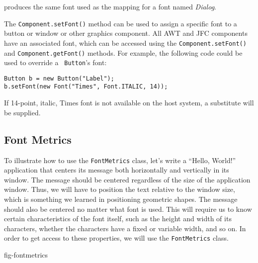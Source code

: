\noindent produces the same font used as the mapping for a
font named {\em Dialog}.


The {\tt Component.setFont()} method can be used to assign a specific
font to a button or window or other graphics component.  All AWT and
JFC components have an associated font, which can be accessed using
the {\tt Component.setFont()} and {\tt Component.getFont()} methods.
For example, the following code could be used to override a {\tt
Button}'s font:

\begin{jjjlisting}
\begin{lstlisting}
Button b = new Button("Label");
b.setFont(new Font("Times", Font.ITALIC, 14));
\end{lstlisting}
\end{jjjlisting}

\noindent If 14-point, italic, Times font is not available on the
host system, a substitute will be supplied.

\subsection{Font Metrics}
\noindent To illustrate how to use the {\tt FontMetrics} class, let's write a
``Hello, World!'' application that centers its message both horizontally and
vertically in its window.  The message should be centered
regardless of the size of the application window.  Thus, we will have to
position the text relative to the window size, which is something we
learned in positioning geometric shapes.   The message
should also be centered no matter what font is used.  This will require
us to know certain characteristics of the font itself, such as the
height and width of its characters, whether the characters have a
fixed or variable width, and so on.  In order to get access to
these properties, we will use the {\tt FontMetrics} class.

{fig-fontmetrics}

